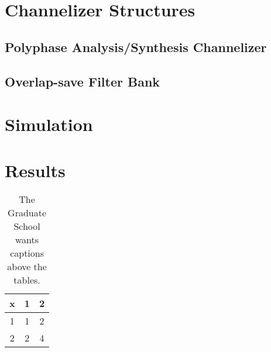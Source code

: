 \documentclass[12pt,dvips]{report}
\begin{document}


\chapter{Channelizer Structures}
\label{sec:chan}
\section{Polyphase Analysis/Synthesis Channelizer}
\label{sec:poly_chan}

\section{Overlap-save Filter Bank}
\label{sec:filter_bank}

\chapter{Simulation}
\label{sec:sim}

\chapter{Results}
\label{sec:results}

%
%

%

 \begin{table}
 \caption{The Graduate School wants captions above the tables.}
\begin{center}
 \begin{tabular}{ccc}
 x & 1 & 2 \\ \hline
 1 & 1 & 2 \\
 2 & 2 & 4 \\ \hline
 \end{tabular}
\end{center}
 \end{table}


%
\end{document}
